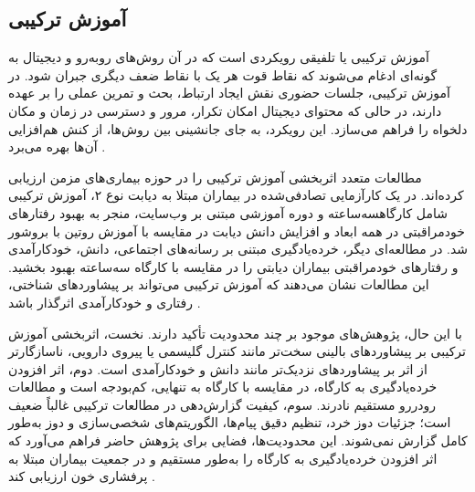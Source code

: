 \subsection{آموزش ترکیبی}
آموزش ترکیبی یا تلفیقی رویکردی است که در آن روش‌های رو‌به‌رو و دیجیتال به گونه‌ای ادغام می‌شوند که نقاط قوت هر یک با نقاط ضعف دیگری جبران شود. در آموزش ترکیبی، جلسات حضوری نقش ایجاد ارتباط، بحث و تمرین عملی را بر عهده دارند، در حالی که محتوای دیجیتال امکان تکرار، مرور و دسترسی در زمان و مکان دلخواه را فراهم می‌سازد. این رویکرد، به جای جانشینی بین روش‌ها، از کنش هم‌افزایی آن‌ها بهره می‌برد \cite{garrison2008blended}.
\par
مطالعات متعدد اثربخشی آموزش ترکیبی را در حوزه بیماری‌های مزمن ارزیابی کرده‌اند. در یک کارآزمایی تصادفی‌شده در بیماران مبتلا به دیابت نوع ۲، آموزش ترکیبی شامل کارگاهسه‌ساعته و دوره آموزشی مبتنی بر وب‌سایت، منجر به بهبود رفتارهای خودمراقبتی در همه ابعاد و افزایش دانش دیابت در مقایسه با آموزش روتین با بروشور شد. در مطالعه‌ای دیگر، خرده‌یادگیری مبتنی بر رسانه‌های اجتماعی، دانش، خودکارآمدی و رفتارهای خودمراقبتی بیماران دیابتی را در مقایسه با کارگاه سه‌ساعته بهبود بخشید. این مطالعات نشان می‌دهند که آموزش ترکیبی می‌تواند بر پیشاوردهای شناختی، رفتاری و خودکارآمدی اثرگذار باشد \cite{ghiyasvandian2023blended,rahbar2024socialmedia}.
\par
با این حال، پژوهش‌های موجود بر چند محدودیت تأکید دارند. نخست، اثربخشی آموزش ترکیبی بر پیشاوردهای بالینی سخت‌تر مانند کنترل گلیسمی یا پیروی دارویی، ناسازگارتر از اثر بر پیشاوردهای نزدیک‌تر مانند دانش و خودکارآمدی است. دوم، اثر افزودن خرده‌یادگیری به کارگاه، در مقایسه با کارگاه به تنهایی، کم‌بودجه است و مطالعات رو‌در‌رو مستقیم نادرند. سوم، کیفیت گزارش‌دهی در مطالعات ترکیبی غالباً ضعیف است؛ جزئیات دوز خرد، تنظیم دقیق پیام‌ها، الگوریتم‌های شخصی‌سازی و دوز به‌طور کامل گزارش نمی‌شوند. این محدودیت‌ها، فضایی برای پژوهش حاضر فراهم می‌آورد که اثر افزودن خرده‌یادگیری به کارگاه را به‌طور مستقیم و در جمعیت بیماران مبتلا به پرفشاری خون ارزیابی کند \cite{lee2022chronicmeta}.


